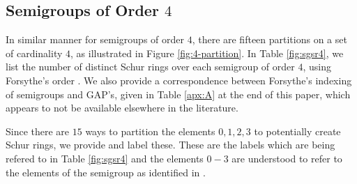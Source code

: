 \documentclass{article}
\theoremstyle{plain}
\theoremstyle{definition}
\begin{document}
\subsection{Semigroups of Order $4$}
In similar manner for semigroups of order $4$, there are fifteen partitions on a set of cardinality $4$, as illustrated in Figure \ref{fig:4-partition}. In Table \ref{fig:sgsr4}, we list the number of distinct Schur rings over each semigroup of order $4$, using Forsythe's order \cite{Forsythe}. We also provide a correspondence between Forsythe's indexing of semigroups and GAP's, given in Table \ref{apx:A} at the end of this paper, which appears to not be available elsewhere in the literature. 

Since there are $15$ ways to partition the elements $0, 1, 2, 3$ to potentially create Schur rings, we provide and label these. These are the labels which are being refered to in Table \ref{fig:sgsr4} and the elements $0-3$ are understood to refer to the elements of the semigroup as identified in \cite{Forsythe}.
\end{document}
